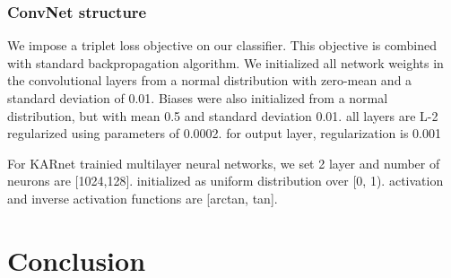 \documentclass[runningheads]{llncs}
\begin{document}


\subsubsection{ConvNet structure}
 We impose a triplet loss objective on our classifier.
This objective is combined with standard backpropagation algorithm.
 We initialized all network weights in the convolutional layers from a normal distribution with zero-mean and a standard deviation of 0.01. Biases were also initialized from a normal distribution, but with mean 0.5 and standard deviation 0.01.
 all layers are L-2 regularized using parameters of 0.0002. for output layer, regularization is 0.001

 For KARnet trainied multilayer neural networks, we set 2 layer and number of neurons are [1024,128]. initialized as uniform distribution over [0, 1).
 activation and inverse activation functions are [arctan, tan].


\section{Conclusion}

%
%
%
%
%
%






\end{document}
